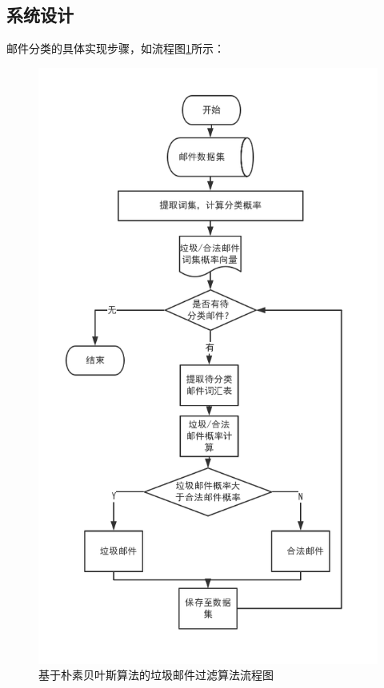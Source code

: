 \documentclass[UTF8,zihao=-4]{ctexart}
\begin{document}
\subsection{系统设计}
	邮件分类的具体实现步骤，如流程图\ref{fig:overall-flowchart}所示：
	
	\begin{figure}[H]
		\centering
		\includegraphics[scale=0.5]{pictures/朴素贝叶斯算法的垃圾邮件过滤算法的流程图.png}
		\caption{基于朴素贝叶斯算法的垃圾邮件过滤算法流程图}
		\label{fig:overall-flowchart}
	\end{figure}
\end{document}
